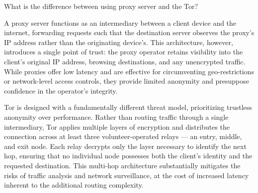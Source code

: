 \item[\textbf{Problem 13}]
What is the difference between using proxy server and the Tor?

\Solution

A proxy server functions as an intermediary between a client device and the
internet, forwarding requests such that the destination server observes the
proxy's IP address rather than the originating device's. This architecture,
however, introduces a single point of trust: the proxy operator retains
visibility into the client's original IP address, browsing destinations, and any
unencrypted traffic. While proxies offer low latency and are effective for
circumventing geo-restrictions or network-level access controls, they provide
limited anonymity and presuppose confidence in the operator's integrity.

Tor is designed with a fundamentally different threat model, prioritizing
trustless anonymity over performance. Rather than routing traffic through a
single intermediary, Tor applies multiple layers of encryption and distributes
the connection across at least three volunteer-operated relays — an entry,
middle, and exit node. Each relay decrypts only the layer necessary to identify
the next hop, ensuring that no individual node possesses both the client's
identity and the requested destination. This multi-hop architecture
substantially mitigates the risks of traffic analysis and network surveillance,
at the cost of increased latency inherent to the additional routing complexity.
